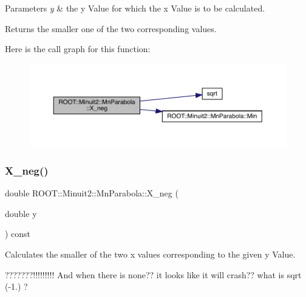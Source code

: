 \begin{DoxyParams}{Parameters}
{\em y} & the y Value for which the x Value is to be calculated.\\
\hline
\end{DoxyParams}
\begin{DoxyReturn}{Returns}
the smaller one of the two corresponding values. 
\end{DoxyReturn}
Here is the call graph for this function\+:
\nopagebreak
\begin{figure}[H]
\begin{center}
\leavevmode
\includegraphics[width=350pt]{db/d7d/classROOT_1_1Minuit2_1_1MnParabola_a16f7f02dd1cb070e89fb007331066ee3_cgraph}
\end{center}
\end{figure}
\mbox{\label{classROOT_1_1Minuit2_1_1MnParabola_a16f7f02dd1cb070e89fb007331066ee3}} 
\subsubsection{\texorpdfstring{X\_neg()}{X\_neg()}\hspace{0.1cm}{\footnotesize\ttfamily [2/2]}}
{\footnotesize\ttfamily double R\+O\+O\+T\+::\+Minuit2\+::\+Mn\+Parabola\+::\+X\+\_\+neg (\begin{DoxyParamCaption}\item[{double}]{y }\end{DoxyParamCaption}) const\hspace{0.3cm}{\ttfamily [inline]}}

Calculates the smaller of the two x values corresponding to the given y Value.

???????!!!!!!!!! And when there is none?? it looks like it will crash?? what is sqrt (-\/1.) ?


